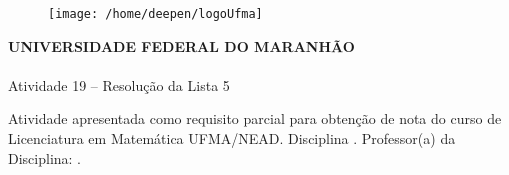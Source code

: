 \begin{figure}[t]
	\centering
\texttt{[image: /home/deepen/logoUfma]}
\end{figure}
\begin{titlepage}
 \vfill
  \begin{center}
   {\large \textbf{UNIVERSIDADE FEDERAL DO MARANHÃO}} \\[2.5cm]

   {\large \textbf{\aluno}}\\[4cm]


   {\Large Atividade 19 – Resolução da Lista 5}\\[4cm]

\vspace{1cm}

   \hspace{.45\textwidth} %
   \begin{minipage}{.5\textwidth}
   \large Atividade apresentada como requisito parcial para obtenção de nota do curso de Licenciatura em Matemática UFMA/NEAD.
   Disciplina \disciplina. Professor(a) da Disciplina: \professor.
  \end{minipage}
  \vfill

\vspace{2cm}

\large \textbf{\cidade}\\
\large \textbf{\ano}
\end{center}
\end{titlepage}
